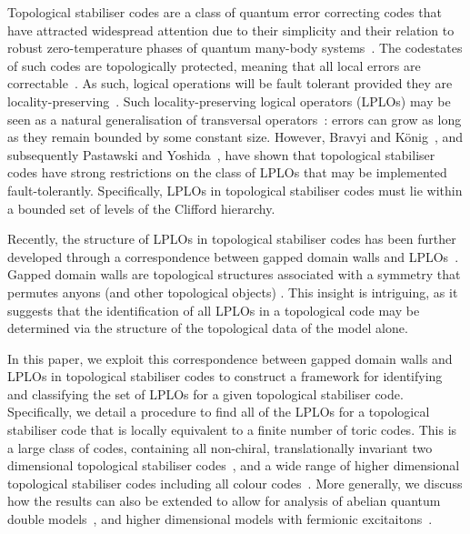 \documentclass[pra,twocolumn,a4paper,nofootinbib]{revtex4-1}
\begin{document}
Topological stabiliser codes are a class of quantum error correcting codes that have attracted widespread attention due to their simplicity and their relation to robust zero-temperature phases of quantum many-body systems~\cite{KitaevA,Bombin2DTSC,Niggetal}.  The codestates of such codes are topologically protected, meaning that all local errors are correctable~\cite{BDcP}. As such, logical operations will be fault tolerant provided they are locality-preserving~\cite{BK}. Such locality-preserving logical operators (LPLOs) may be seen as a natural generalisation of transversal operators~\cite{Terhal}: errors can grow as long as they remain bounded by some constant size.  However, Bravyi and K{\"o}nig~\cite{BK}, and subsequently Pastawski and Yoshida~\cite{PY}, have shown that topological stabiliser codes have strong restrictions on the class of LPLOs that may be implemented fault-tolerantly.  Specifically, LPLOs in topological stabiliser codes must lie within a bounded set of levels of the Clifford hierarchy.  

Recently, the structure of LPLOs in topological stabiliser codes has been further developed through a correspondence between gapped domain walls and LPLOs~\cite{YoshidaA}. Gapped domain walls are topological structures associated with a symmetry that permutes anyons (and other topological objects)  \cite{KitaevKong,Lanetal}.  This insight is intriguing, as it suggests that the identification of all LPLOs in a topological code may be determined via the structure of the topological data of the model alone.

In this paper, we exploit this correspondence between gapped domain walls and LPLOs in topological stabiliser codes to construct a framework for identifying and classifying the set of LPLOs for a given topological stabiliser code.  Specifically, we detail a procedure to find all of the LPLOs for a topological stabiliser code that is locally equivalent to a finite number of toric codes. This is a large class of codes, containing all non-chiral, translationally invariant two dimensional topological stabiliser codes~\cite{BDcP}, and a wide range of higher dimensional topological stabiliser codes including all colour codes~\cite{Kubica}. More generally, we discuss how the results can also be extended to allow for analysis of abelian quantum double models~\cite{KitaevA,YoshidaC}, and higher dimensional models with fermionic excitaitons~\cite{LW}.
\end{document}
